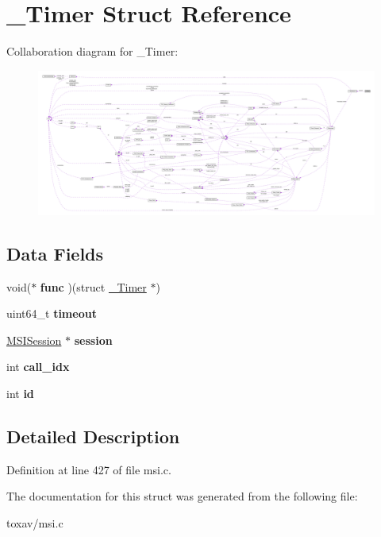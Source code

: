 \hypertarget{struct___timer}{\section{\+\_\+\+Timer Struct Reference}
\label{struct___timer}
}


Collaboration diagram for \+\_\+\+Timer\+:\nopagebreak
\begin{figure}[H]
\begin{center}
\leavevmode
\includegraphics[width=350pt]{struct___timer__coll__graph}
\end{center}
\end{figure}
\subsection*{Data Fields}
\begin{DoxyCompactItemize}
\item 
\hypertarget{struct___timer_a7b75ecf42c49a289b6dd4fefdbf86605}{void($\ast$ {\bfseries func} )(struct \hyperlink{struct___timer}{\+\_\+\+Timer} $\ast$)}\label{struct___timer_a7b75ecf42c49a289b6dd4fefdbf86605}

\item 
\hypertarget{struct___timer_a053cdea1d85795444fe1aaa6b277a0ec}{uint64\+\_\+t {\bfseries timeout}}\label{struct___timer_a053cdea1d85795444fe1aaa6b277a0ec}

\item 
\hypertarget{struct___timer_affcb6f96b80aecebae0f1b157c6242b5}{\hyperlink{struct___m_s_i_session}{M\+S\+I\+Session} $\ast$ {\bfseries session}}\label{struct___timer_affcb6f96b80aecebae0f1b157c6242b5}

\item 
\hypertarget{struct___timer_a1137c8c8a662d51868eda69bd73915d0}{int {\bfseries call\+\_\+idx}}\label{struct___timer_a1137c8c8a662d51868eda69bd73915d0}

\item 
\hypertarget{struct___timer_a7441ef0865bcb3db9b8064dd7375c1ea}{int {\bfseries id}}\label{struct___timer_a7441ef0865bcb3db9b8064dd7375c1ea}

\end{DoxyCompactItemize}


\subsection{Detailed Description}


Definition at line 427 of file msi.\+c.



The documentation for this struct was generated from the following file\+:\begin{DoxyCompactItemize}
\item 
toxav/msi.\+c\end{DoxyCompactItemize}
